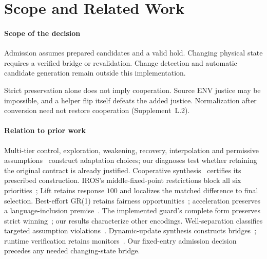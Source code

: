 \section{Scope and Related Work}\label{sec:discussion}
\paragraph{Scope of the decision}
Admission assumes prepared candidates and a valid hold. Changing physical
state requires a verified bridge or revalidation. Change detection and
automatic candidate generation remain outside this implementation.

\balance
Strict preservation alone does not imply cooperation. Source ENV justice
may be impossible, and a helper flip itself defeats the added justice.
Normalization after conversion need not restore cooperation (Supplement~L.2).

\paragraph{Relation to prior work}
Multi-tier control, exploration, weakening, recovery, interpolation
and permissive assumptions~\cite{dippolito2014multitier,keegan2022discovery,weakening2023,graceful2024,cavezza2017interpolation,anand2023apa}
construct adaptation choices; our diagnoses test whether retaining the
original contract is already justified.
Cooperative synthesis~\cite{cooperative,friendly} certifies its prescribed
construction. IROS's middle-fixed-point restrictions block all six
priorities~\cite[author appendix, p.~9]{iros}; Lift retains response $100$
and localizes the matched difference to final selection.
Best-effort GR(1) retains fairness opportunities~\cite{besteffort};
acceleration preserves a language-inclusion premise~\cite[Sections~2.3,~4.1]{accelerating}.
The implemented guard's complete form preserves strict
winning~\cite{spectrarelease2024}; our results characterize other encodings.
Well-separation classifies targeted assumption violations~\cite[Section~6.3]{wellsep}.
Dynamic-update synthesis constructs bridges~\cite{nahabedian2020dynamic,dupdate};
runtime verification retains monitors~\cite{runtimeverification2023}.
Our fixed-entry admission decision precedes any needed changing-state bridge.

